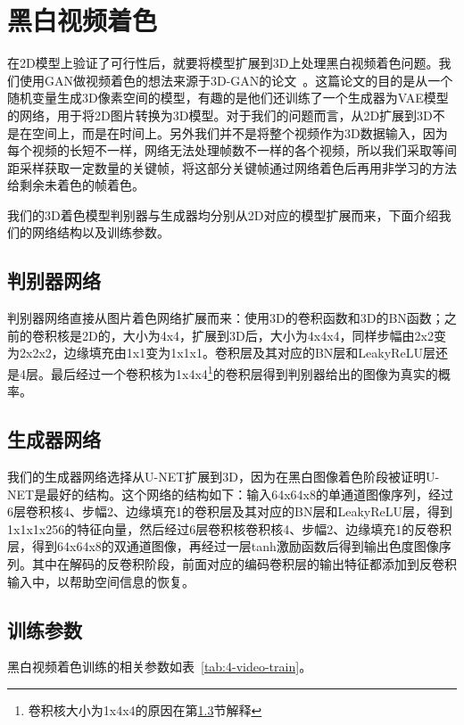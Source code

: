 \chapter{黑白视频着色}
\label{cha:4-video-color}

  在2D模型上验证了可行性后，就要将模型扩展到3D上处理黑白视频着色问题。我们使用GAN做视频着色的想法来源于3D-GAN的论文~\cite{DBLP:conf/nips/0001ZXFT16}。这篇论文的目的是从一个随机变量生成3D像素空间的模型，有趣的是他们还训练了一个生成器为VAE模型的网络，用于将2D图片转换为3D模型。对于我们的问题而言，从2D扩展到3D不是在空间上，而是在时间上。另外我们并不是将整个视频作为3D数据输入，因为每个视频的长短不一样，网络无法处理帧数不一样的各个视频，所以我们采取等间距采样获取一定数量的关键帧，将这部分关键帧通过网络着色后再用非学习的方法给剩余未着色的帧着色。

  我们的3D着色模型判别器与生成器均分别从2D对应的模型扩展而来，下面介绍我们的网络结构以及训练参数。

\section{判别器网络}
\label{sec:4-d-net}
  
  判别器网络直接从图片着色网络扩展而来：使用3D的卷积函数和3D的BN函数；之前的卷积核是2D的，大小为4x4，扩展到3D后，大小为4x4x4，同样步幅由2x2变为2x2x2，边缘填充由1x1变为1x1x1。卷积层及其对应的BN层和LeakyReLU层还是4层。最后经过一个卷积核为1x4x4\footnote{卷积核大小为1x4x4的原因在第\ref{sec:4-train}节解释}的卷积层得到判别器给出的图像为真实的概率。
  
\section{生成器网络}
\label{sec:4-g-net}

  我们的生成器网络选择从U-NET扩展到3D，因为在黑白图像着色阶段被证明U-NET是最好的结构。这个网络的结构如下：输入64x64x8的单通道图像序列，经过6层卷积核4、步幅2、边缘填充1的卷积层及其对应的BN层和LeakyReLU层，得到1x1x1x256的特征向量，然后经过6层卷积核卷积核4、步幅2、边缘填充1的反卷积层，得到64x64x8的双通道图像，再经过一层tanh激励函数后得到输出色度图像序列。其中在解码的反卷积阶段，前面对应的编码卷积层的输出特征都添加到反卷积输入中，以帮助空间信息的恢复。

\section{训练参数}
\label{sec:4-train}

  黑白视频着色训练的相关参数如表~\ref{tab:4-video-train}。

